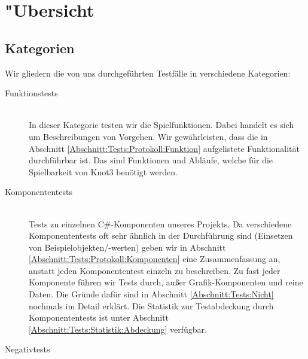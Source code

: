 %



\section{{"U}bersicht}
\label{Abschnitt:Tests:Uebersicht}



\subsection{Kategorien}
\label{Abschnitt:Tests:Uebersicht:Kategorien}

Wir gliedern die von uns durchgeführten Testfälle in verschiedene Kategorien:\\


\begin{description} %


	\item[Funktionstests] \hfill
	\\
	
	In dieser Kategorie testen wir die Spielfunktionen. Dabei handelt es sich um Beschreibungen von Vorgehen. Wir gewährleisten, dass die in Abschnitt \ref{Abschnitt:Tests:Protokoll:Funktion} aufgelistete Funktionalität durchführbar ist. Das sind Funktionen und Abläufe, welche für die Spielbarkeit von Knot3 benötigt werden.\\
	  
	
	\item[Komponententests] \hfill
	\\
	
	Tests zu einzelnen C\#-Komponenten unseres Projekts. Da verschiedene Komponententests oft sehr ähnlich in der Durchführung sind (Einsetzen von Beispielobjekten/-werten) geben wir in Abschnitt \ref{Abschnitt:Tests:Protokoll:Komponenten} eine Zusammenfassung an, anstatt jeden Komponententest einzeln zu beschreiben.
	Zu fast jeder Komponente führen wir Tests durch, außer Grafik-Komponenten und reine Daten. Die Gründe dafür sind in Abschnitt \ref{Abschnitt:Tests:Nicht} nochmals im Detail erklärt. Die Statistik zur Testabdeckung durch Komponententests ist unter Abschnitt \ref{Abschnitt:Tests:Statistik:Abdeckung} verfügbar.\\


	\item[Negativtests] \hfill
	\\
	

\end{description}

